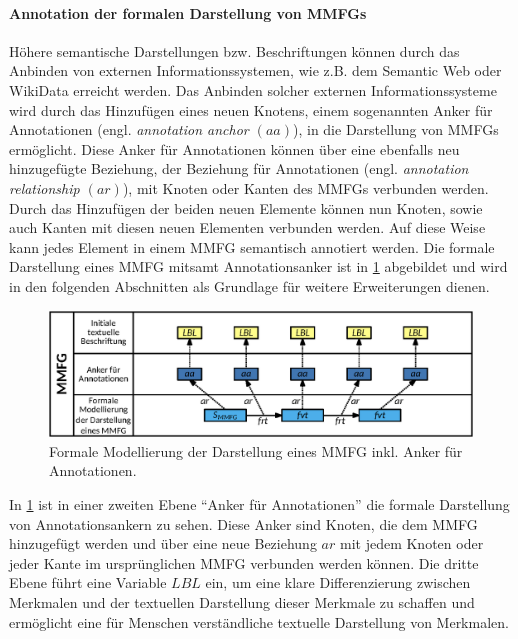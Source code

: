 \paragraph{Annotation der formalen Darstellung von MMFGs}
\label{sec2:sota:par:annot-formal-representation-mmfgs}
Höhere semantische Darstellungen bzw. Beschriftungen können durch das Anbinden von externen Informationssystemen, wie z.B. dem Semantic Web oder WikiData erreicht werden.
Das Anbinden solcher externen Informationssysteme wird durch das Hinzufügen eines neuen Knotens, einem sogenannten Anker für Annotationen (engl. \textit{annotation anchor $(aa)$}), in die Darstellung von MMFGs ermöglicht.
Diese Anker für Annotationen können über eine ebenfalls neu hinzugefügte Beziehung, der Beziehung für Annotationen (engl. \textit{annotation relationship $(ar)$}), mit Knoten oder Kanten des MMFGs verbunden werden.
Durch das Hinzufügen der beiden neuen Elemente können nun Knoten, sowie auch Kanten mit diesen neuen Elementen verbunden werden.
Auf diese Weise kann jedes Element in einem MMFG semantisch annotiert werden.
Die formale Darstellung eines MMFG mitsamt Annotationsanker ist in \cref{sec2:sota:subsec:fz-explainablity:fig:mmfg-formal-model-mmfg-incl-annotations} abgebildet und wird in den folgenden Abschnitten als Grundlage für weitere Erweiterungen dienen.

\begin{figure}[htb]
    \centering
    \includegraphics[width=\textwidth]{chapter/chapter_2/mmfg/annotation/formal-model-syntactic-mmfg-incl-annotations.eps}
    \caption{Formale Modellierung der Darstellung eines MMFG inkl. Anker für Annotationen.}
    \label{sec2:sota:subsec:fz-explainablity:fig:mmfg-formal-model-mmfg-incl-annotations}
\end{figure}
In \cref{sec2:sota:subsec:fz-explainablity:fig:mmfg-formal-model-mmfg-incl-annotations} ist in einer zweiten Ebene \enquote{Anker für Annotationen} die formale Darstellung von Annotationsankern zu sehen.
Diese Anker sind Knoten, die dem MMFG hinzugefügt werden und über eine neue Beziehung $ar$ mit jedem Knoten oder jeder Kante im ursprünglichen MMFG verbunden werden können.
Die dritte Ebene führt eine Variable $LBL$ ein, um eine klare Differenzierung zwischen Merkmalen und der textuellen Darstellung dieser Merkmale zu schaffen und ermöglicht eine für Menschen verständliche textuelle Darstellung von Merkmalen.

